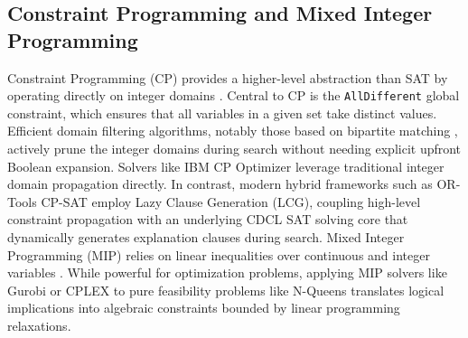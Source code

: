 \subsection{Constraint Programming and Mixed Integer Programming}
Constraint Programming (CP) provides a higher-level abstraction than SAT by operating directly on integer domains \citep{rossi2006handbook}. Central to CP is the \texttt{AllDifferent} global constraint, which ensures that all variables in a given set take distinct values. Efficient domain filtering algorithms, notably those based on bipartite matching \citep{regin1994filtering}, actively prune the integer domains during search without needing explicit upfront Boolean expansion. Solvers like IBM CP Optimizer leverage traditional integer domain propagation directly. In contrast, modern hybrid frameworks such as OR-Tools CP-SAT \citep{perron2019or} employ Lazy Clause Generation (LCG), coupling high-level constraint propagation with an underlying CDCL SAT solving core that dynamically generates explanation clauses during search.
Mixed Integer Programming (MIP) relies on linear inequalities over continuous and integer variables \citep{wolsey2020integer}. While powerful for optimization problems, applying MIP solvers like Gurobi or CPLEX to pure feasibility problems like N-Queens translates logical implications into algebraic constraints bounded by linear programming relaxations.
